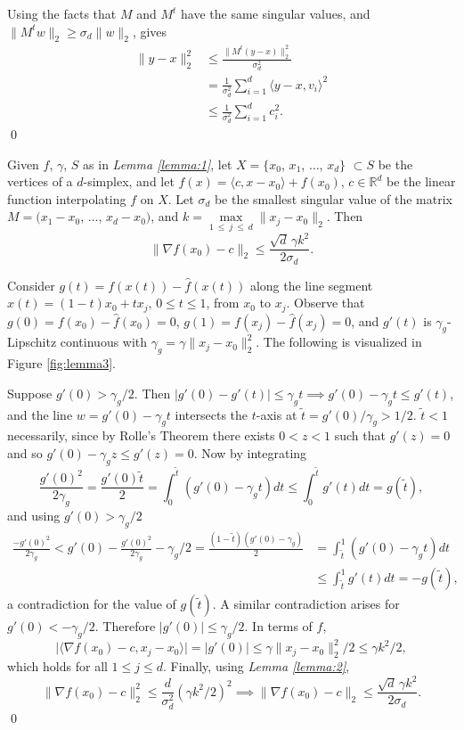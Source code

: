 \begin{proofdot}
  Using the facts that $M$ and $M^t$ have the same singular values,
  and $\|M^tw\|_2 \geq \sigma_d \|w\|_2$, gives
  \begin{align*}
    \|y - x\|_2^2 &\leq \frac{\|M^t (y - x)\|_2^2}{\sigma_d^2} \\
                  &=    \frac{1}{\sigma_d^2} \sum_{i=1}^d \langle y - x, v_i \rangle^2 \\
                  &\leq \frac{1}{\sigma_d^2} \sum_{i=1}^d c_i^2.
  \end{align*}
  \qed
\end{proofdot}


\begin{plainlemma}
  \label{lemma:3}
  Given $f$, $\gamma$, $S$ as in {\it Lemma \ref{lemma:1}}, let $X =
  \{x_0$, $x_1$, $\ldots$, $x_d\}$ $\subset S$ be the vertices of a
  $d$-simplex, and let $\hat f(x) = \langle c, x - x_0 \rangle +
  f(x_0)$, $c \in \mathbb{R}^d$ be the linear function interpolating
  $f$ on $X.$ Let $\sigma_d$ be the smallest singular value of the
  matrix $M = (x_1 - x_0$, $\ldots$, $x_d - x_0)$, and $k =
  \max\limits_{1\ \leq\ j\ \leq\ d} \|x_j - x_0\|_2.$ Then
  $$\big\|\nabla f(x_0) - c\big\|_2 \leq \frac{\sqrt{d} \, \gamma k^2}{2 \sigma_d}.$$
\end{plainlemma}

\begin{proofdot}
  \def\g{\gamma_g}
  Consider $g(t)=f(x(t)) - \hat f(x(t))$ along
  the line segment $x(t)=(1-t)x_0 + tx_j$, $0\le t\le1$, from $x_0$ to
  $x_j$.  Observe that $g(0)=f(x_0) - \hat f(x_0) = 0$, $g(1)=f(x_j) -
  \hat f(x_j) = 0$, and $g'(t)$ is $\g$-Lipschitz continuous with $\g
  = \gamma \|x_j-x_0\|_2^2$. The following is visualized in 
  Figure \ref{fig:lemma3}.

  Suppose $g'(0) > \g/2$. Then $|g'(0)-g'(t)| \le \g t \implies g'(0)
  - \g t \le g'(t)$, and the line $w=g'(0)-\g t$ intersects the
  $t$-axis at $\tilde t=g'(0)/\g > 1/2$. $\tilde t<1$ necessarily,
  since by Rolle's Theorem there exists $0<z<1$ such that $g'(z)=0$
  and so $g'(0) - \g z \le g'(z) = 0$. Now by integrating
  $$\frac{g'(0)^2}{2\g} = \frac{g'(0)\tilde t}{2} = \int_0^{\tilde t}
  (g'(0)-\g t)dt \le \int_0^{\tilde t} g'(t)dt = g(\tilde t),$$ and
  using $g'(0) > \g / 2$
  \begin{align*}
    \frac{-g'(0)^2}{2\g} < g'(0) - \frac{g'(0)^2}{2\g} - \g/2 =
    \frac{(1-\tilde t)(g'(0)-\g)}{2} &= \int_{\tilde t}^1 (g'(0)-\g
    t)dt \\ &\le \int_{\tilde t}^1 g'(t)dt = -g(\tilde t),
  \end{align*}
  \noindent a contradiction for the value of $g(\tilde t)$. A similar
  contradiction arises for $g'(0)<-\g/2$. Therefore $|g'(0)| \le
  \g/2$. In terms of $f$,
  $$\bigl|\langle \nabla f(x_0)-c,x_j-x_0\rangle\bigr| = |g'(0)| \le
  \gamma \|x_j-x_0\|_2^2/2 \le \gamma k^2 / 2,$$ which holds for all
  $1\le j\le d$.  Finally, using {\it Lemma \ref{lemma:2}},
  $$\|\nabla f(x_0)-c\|_2^2 \le \frac{d}{\sigma_d^2}(\gamma k^2/2)^2
  \implies \|\nabla f(x_0)-c\|_2 \le \frac{\sqrt{d} \, \gamma
    k^2}{2\sigma_d}.$$ \qed
\end{proofdot}

